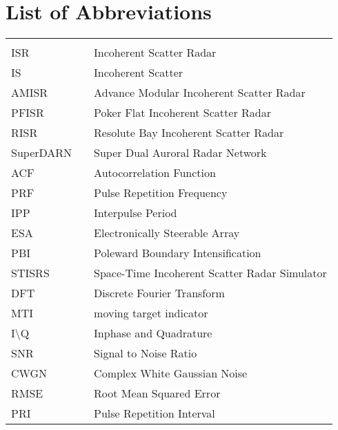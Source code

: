 \chapter*{List of Abbreviations}
\begin{center}
  \begin{tabular}{lll}
    \hspace*{2em} & \hspace*{1in} & \hspace*{4.5in} \\
    ISR  & \dotfill & Incoherent Scatter Radar \\
    IS & \dotfill & Incoherent Scatter\\
    AMISR  & \dotfill & Advance Modular Incoherent Scatter Radar \\
    PFISR & \dotfill & Poker Flat Incoherent Scatter Radar\\
    RISR & \dotfill & Resolute Bay Incoherent Scatter Radar\\
    SuperDARN & \dotfill & Super Dual Auroral Radar Network\\
    ACF & \dotfill & Autocorrelation Function\\
    PRF & \dotfill & Pulse Repetition Frequency \\
    IPP & \dotfill & Interpulse Period\\
    ESA  & \dotfill & Electronically Steerable Array \\
    PBI & \dotfill & Poleward Boundary Intensification \\
    STISRS & \dotfill & Space-Time Incoherent Scatter Radar Simulator \\
    DFT & \dotfill & Discrete Fourier Transform \\
    MTI & \dotfill & moving target indicator \\
    I\textbackslash Q & \dotfill & Inphase and Quadrature\\
    SNR & \dotfill & Signal to Noise Ratio\\
    CWGN & \dotfill & Complex White Gaussian Noise\\
    RMSE & \dotfill & Root Mean Squared Error\\
    PRI & \dotfill & Pulse Repetition Interval

 
  \end{tabular}
\end{center}
\cleardoublepage


\newpage
\endofprelim
